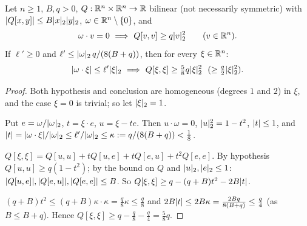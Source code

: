 \begin{lemma}\label{bpN:p1:conic-coercive}
Let $n\ge1$, $B,q>0$, $Q:\mathbb{R}^n\times\mathbb{R}^n\to\mathbb{R}$ bilinear (not necessarily symmetric) with $\lvert Q[x,y]\rvert\le B\lvert x\rvert_2\lvert y\rvert_2$, $\omega\in\mathbb{R}^n\setminus\{0\}$, and
\[\omega\cdot v=0\ \Longrightarrow\ Q[v,v]\ge q\lvert v\rvert_2^2\qquad(v\in\mathbb{R}^n).\]
If $\ell'\ge0$ and $\ell'\le\lvert \omega\rvert_2\,q/(8(B+q))$, then for every $\xi\in\mathbb{R}^n$:
\[\abs{\omega\cdot\xi}\le\ell'\abs\xi_2\ \Longrightarrow\ Q[\xi,\xi]\ge\tfrac58q\abs\xi_2^2\ \ (\ge\tfrac q2\abs\xi_2^2).\]
\end{lemma}
\begin{proof}
\label{stepN:p1:cc-unit} Both hypothesis and conclusion are homogeneous (degrees $1$ and $2$) in $\xi$, and the case $\xi=0$ is trivial; so let $\lvert \xi\rvert_2=1$.

\label{stepN:p1:cc-decomp} Put $e=\omega/\lvert \omega\rvert_2$, $t=\xi\cdot e$, $u=\xi-te$. Then $u\cdot\omega=0$, $\lvert u\rvert_2^2=1-t^2$, $\lvert t\rvert\le1$, and
$\lvert t\rvert=\lvert \omega\cdot\xi\rvert/\lvert \omega\rvert_2\le\ell'/\lvert \omega\rvert_2\le\kappa:=q/(8(B+q))<\tfrac18$.

\label{stepN:p1:cc-expand} $Q[\xi,\xi]=Q[u,u]+tQ[u,e]+tQ[e,u]+t^2Q[e,e]$. By hypothesis $Q[u,u]\ge q(1-t^2)$; by the bound on $Q$ and $\lvert u\rvert_2,\lvert e\rvert_2\le1$:
$\lvert Q[u,e]\rvert,\lvert Q[e,u]\rvert,\lvert Q[e,e]\rvert\le B$. So
$Q[\xi,\xi]\ge q-(q+B)t^2-2B\lvert t\rvert$.

\label{stepN:p1:cc-num} $(q+B)t^2\le(q+B)\kappa\cdot\kappa=\frac q8\kappa\le\frac q8$ and $2B\lvert t\rvert\le2B\kappa=\frac{2Bq}{8(B+q)}\le\frac q4$ (as $B\le B+q$). Hence $Q[\xi,\xi]\ge q-\frac q8-\frac q4=\frac58q$.
\end{proof}

